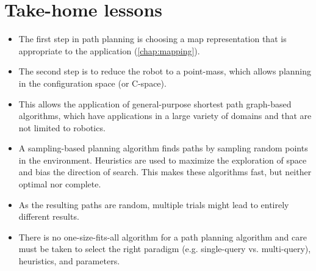 \section*{Take-home lessons}
\begin{itemize}
\item The first step in path planning is choosing a map representation that is appropriate to the application (\cref{chap:mapping}).
\item The second step is to reduce the robot to a point-mass, which allows planning in the configuration space (or C-space).
\item This allows the application of general-purpose shortest path graph-based algorithms, which have applications in a large variety of domains and that are not limited to robotics.
\item A sampling-based planning algorithm finds paths by sampling random points in the environment. Heuristics are used to maximize the exploration of space and bias the direction of search. This makes these algorithms fast, but neither optimal nor complete.
\item As the resulting paths are random, multiple trials might lead to entirely different results.
\item There is no one-size-fits-all algorithm for a path planning algorithm and care must be taken to select the right paradigm (e.g. single-query vs. multi-query), heuristics, and parameters.
\end{itemize}

